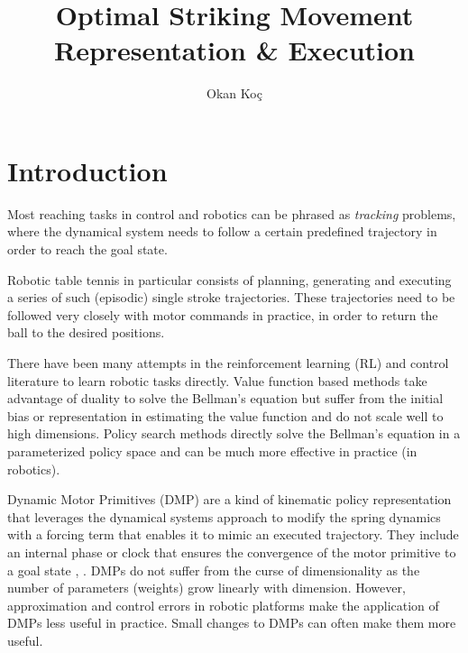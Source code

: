 \documentclass[10pt,a4paper]{article}
\author{Okan Ko\c c}
\title{Optimal Striking Movement Representation \& Execution}
\begin{document}
\maketitle

\section{Introduction}\label{introduction}



Most reaching tasks in control and robotics can be phrased as \emph{tracking} problems, where the dynamical system needs to follow a certain predefined trajectory in order to reach the goal state. 

Robotic table tennis in particular consists of planning, generating and executing a series of such (episodic) single stroke trajectories. These trajectories need to be followed very closely with motor commands in practice, in order to return the ball to the desired positions. 

There have been many attempts in the reinforcement learning (RL) \cite{Sutton98} and control literature to learn robotic tasks directly. Value function based methods take advantage of duality to solve the Bellman's equation but suffer from the initial bias or representation in estimating the value function and do not scale well to high dimensions. Policy search methods directly solve the Bellman's equation in a parameterized policy space and can be much more effective in practice (in robotics). 

Dynamic Motor Primitives (DMP) are a kind of kinematic policy representation that leverages the dynamical systems approach to modify the spring dynamics with a forcing term that enables it to mimic an executed trajectory. They include an internal phase or clock that ensures the convergence of the motor primitive to a goal state \cite{Ijspeert13}, \cite{Schaal07}. DMPs do not suffer from the curse of dimensionality as the number of parameters (weights) grow linearly with dimension. However, approximation and control errors in robotic platforms make the application of DMPs less useful in practice. Small changes to DMPs can often make them more useful.

\end{document}
